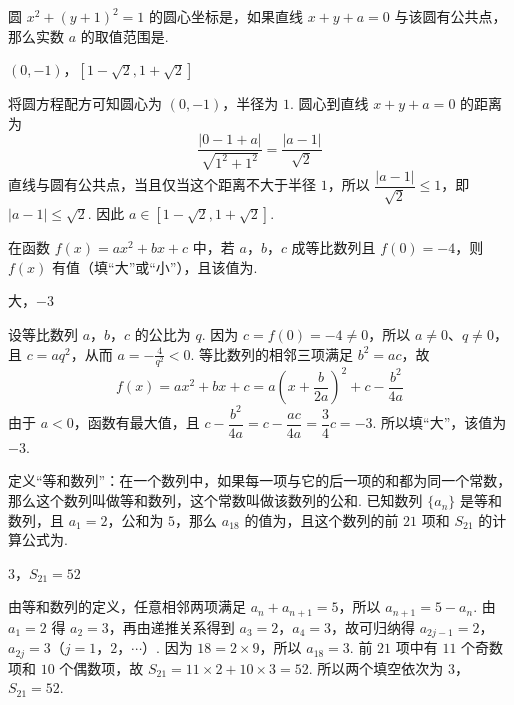 \begin{problem}
圆 \(x^{2}+(y+1)^{2}=1\) 的圆心坐标是\fillinblank{}，如果直线 \(x+y+a=0\) 与该圆有公共点，那么实数 \(a\) 的取值范围是\fillinblank{}.
\begin{answer}
\((0,-1)\)，\([1-\sqrt{2},1+\sqrt{2}]\)
\end{answer}

\begin{solution}
将圆方程配方可知圆心为 \((0,-1)\)，半径为 \(1\). 圆心到直线 \(x+y+a=0\) 的距离为
\[
\frac{|0-1+a|}{\sqrt{1^{2}+1^{2}}}=\frac{|a-1|}{\sqrt2}
\]
直线与圆有公共点，当且仅当这个距离不大于半径 \(1\)，所以 \(\dfrac{|a-1|}{\sqrt2}\leqslant1\)，即 \(|a-1|\leqslant\sqrt2\). 因此 \(a\in[1-\sqrt2,1+\sqrt2]\).
\end{solution}

\end{problem}

\begin{problem}
在函数 \(f(x)=ax^{2}+bx+c\) 中，若 \(a\)，\(b\)，\(c\) 成等比数列且 \(f(0)=-4\)，则 \(f(x)\) 有\fillinblank{}值（填“大”或“小”），且该值为\fillinblank{}.
\begin{answer}
大，\(-3\)
\end{answer}

\begin{solution}
设等比数列 \(a\)，\(b\)，\(c\) 的公比为 \(q\). 因为 \(c=f(0)=-4\neq0\)，所以 \(a\neq0\)、\(q\neq0\)，且 \(c=aq^{2}\)，从而 \(a=-\frac{4}{q^{2}}<0\). 等比数列的相邻三项满足 \(b^{2}=ac\)，故
\[
f(x)=ax^{2}+bx+c
=a\left(x+\frac{b}{2a}\right)^{2}+c-\frac{b^{2}}{4a}
\]
由于 \(a<0\)，函数有最大值，且 \(c-\dfrac{b^{2}}{4a}=c-\dfrac{ac}{4a}=\dfrac34c=-3\). 所以填“大”，该值为 \(-3\).
\end{solution}

\end{problem}

\begin{problem}
定义“等和数列”：在一个数列中，如果每一项与它的后一项的和都为同一个常数，那么这个数列叫做等和数列，这个常数叫做该数列的公和. 已知数列 \(\{a_{n}\}\) 是等和数列，且 \(a_{1}=2\)，公和为 \(5\)，那么 \(a_{18}\) 的值为\fillinblank{}，且这个数列的前 \(21\) 项和 \(S_{21}\) 的计算公式为\fillinblank{}.
\begin{answer}
\(3\)，\(S_{21}=52\)
\end{answer}

\begin{solution}
由等和数列的定义，任意相邻两项满足 \(a_n+a_{n+1}=5\)，所以 \(a_{n+1}=5-a_n\). 由 \(a_1=2\) 得 \(a_2=3\)，再由递推关系得到 \(a_3=2\)，\(a_4=3\)，故可归纳得 \(a_{2j-1}=2\)，\(a_{2j}=3\)（\(j=1\)，\(2\)，\(\cdots\)）. 因为 \(18=2\times9\)，所以 \(a_{18}=3\). 前 \(21\) 项中有 \(11\) 个奇数项和 \(10\) 个偶数项，故
\(S_{21}=11\times2+10\times3=52\). 所以两个填空依次为 \(3\)，\(S_{21}=52\).
\end{solution}

\end{problem}

